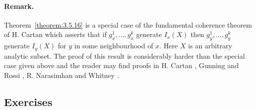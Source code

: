 \paragraph*{Remark.} Theorem~\ref{theorem:3.5.16} is a special case of the fundamental coherence theorem of H. Cartan which asserts that if $g_x^1,\ldots,g_x^k$ generate $I_x(X)$ then $g_y^1,\ldots,g_y^k$ generate $I_y(X)$ for $y$ in some neighbourhood of $x$. Here $X$ is an arbitrary analytic subset. The proof of this result is considerably harder than the special case given above and the reader may find proofs in H. Cartan \cite{bib:I:cartan-h:2}, Gunning and Rossi \cite{bib:I:gunning-r-c-and-rossi-h:1}, R. Narasimhan \cite{bib:I:narasimhan-r:3} and Whitney \cite{bib:I:whitney-h:1}.
\subsection*{Exercises}
